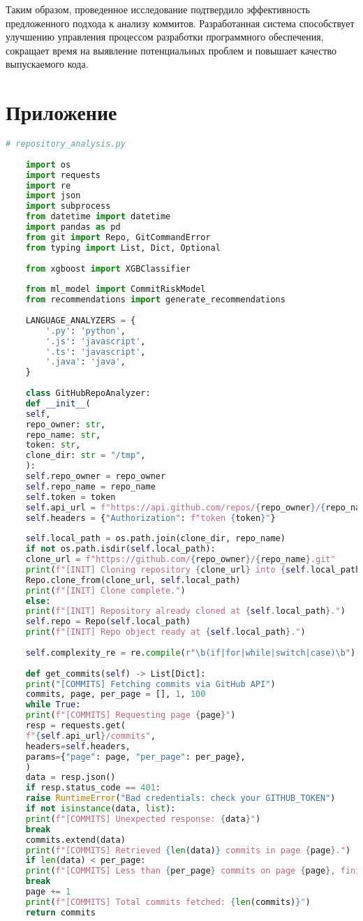 Таким образом, проведенное исследование подтвердило эффективность предложенного подхода к анализу коммитов. Разработанная система способствует улучшению управления процессом разработки программного обеспечения, сокращает время на выявление потенциальных проблем и повышает качество выпускаемого кода.


\chapter*{Приложение} \label{ch5}

\begin{lstlisting}[language=Python, caption={{ \texttt{repository\_analysis.py}}}]
	# repository_analysis.py
	
	import os
	import requests
	import re
	import json
	import subprocess
	from datetime import datetime
	import pandas as pd
	from git import Repo, GitCommandError
	from typing import List, Dict, Optional
	
	from xgboost import XGBClassifier
	
	from ml_model import CommitRiskModel
	from recommendations import generate_recommendations
	
	LANGUAGE_ANALYZERS = {
		'.py': 'python',
		'.js': 'javascript',
		'.ts': 'javascript',
		'.java': 'java',
	}
	
	class GitHubRepoAnalyzer:
	def __init__(
	self,
	repo_owner: str,
	repo_name: str,
	token: str,
	clone_dir: str = "/tmp",
	):
	self.repo_owner = repo_owner
	self.repo_name = repo_name
	self.token = token
	self.api_url = f"https://api.github.com/repos/{repo_owner}/{repo_name}"
	self.headers = {"Authorization": f"token {token}"}
	
	self.local_path = os.path.join(clone_dir, repo_name)
	if not os.path.isdir(self.local_path):
	clone_url = f"https://github.com/{repo_owner}/{repo_name}.git"
	print(f"[INIT] Cloning repository {clone_url} into {self.local_path}")
	Repo.clone_from(clone_url, self.local_path)
	print(f"[INIT] Clone complete.")
	else:
	print(f"[INIT] Repository already cloned at {self.local_path}.")
	self.repo = Repo(self.local_path)
	print(f"[INIT] Repo object ready at {self.local_path}.")
	
	self.complexity_re = re.compile(r"\b(if|for|while|switch|case)\b")
	
	def get_commits(self) -> List[Dict]:
	print("[COMMITS] Fetching commits via GitHub API")
	commits, page, per_page = [], 1, 100
	while True:
	print(f"[COMMITS] Requesting page {page}")
	resp = requests.get(
	f"{self.api_url}/commits",
	headers=self.headers,
	params={"page": page, "per_page": per_page},
	)
	data = resp.json()
	if resp.status_code == 401:
	raise RuntimeError("Bad credentials: check your GITHUB_TOKEN")
	if not isinstance(data, list):
	print(f"[COMMITS] Unexpected response: {data}")
	break
	commits.extend(data)
	print(f"[COMMITS] Retrieved {len(data)} commits in page {page}.")
	if len(data) < per_page:
	print(f"[COMMITS] Less than {per_page} commits on page {page}, finishing.")
	break
	page += 1
	print(f"[COMMITS] Total commits fetched: {len(commits)}")
	return commits
	

\end{lstlisting}
